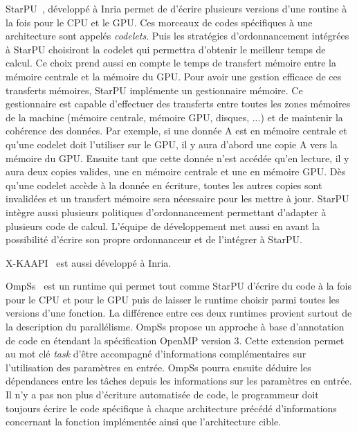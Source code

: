 StarPU~\cite{starpu}, développé à Inria permet de d'écrire plusieurs versions d'une routine à la fois pour le CPU et le GPU.
%
Ces morceaux de codes spécifiques à une architecture sont appelés {\em codelets}.
%
Puis les stratégies d'ordonnancement intégrées à StarPU choisiront la codelet qui permettra d'obtenir le meilleur temps de calcul.
%
Ce choix prend aussi en compte le temps de transfert mémoire entre la mémoire centrale et la mémoire du GPU.
%
Pour avoir une gestion efficace de ces transferts mémoires, StarPU implémente un gestionnaire mémoire.
%
Ce gestionnaire est capable d'effectuer des transferts entre toutes les zones mémoires de la machine (mémoire centrale, mémoire GPU, disques, ...) et de maintenir la cohérence des données.
%
Par exemple, si une donnée A est en mémoire centrale et qu'une codelet doit l'utiliser sur le GPU, il y aura d'abord une copie A vers la mémoire du GPU.
%
Ensuite tant que cette donnée n'est accédée qu'en lecture, il y aura deux copies valides, une en mémoire centrale et une en mémoire GPU.
%
Dès qu'une codelet accède à la donnée en écriture, toutes les autres copies sont invalidées et un transfert mémoire sera nécessaire pour les mettre à jour.
%
StarPU intègre aussi plusieurs politiques d'ordonnancement permettant d'adapter à plusieurs code de calcul.
%
L'équipe de développement met aussi en avant la possibilité d'écrire son propre ordonnanceur et de l'intégrer à StarPU.


X-KAAPI~\cite{xkaapi} est aussi développé à Inria.



OmpSs~\cite{OMPSs} est un runtime qui permet tout comme StarPU d'écrire du code à la fois pour le CPU et pour le GPU puis de laisser le runtime choisir parmi toutes les versions d'une fonction.
%
La différence entre ces deux runtimes provient surtout de la description du parallélisme.
%
OmpSs propose un approche à base d'annotation de code en étendant la spécification OpenMP version 3.
%
Cette extension permet au mot clé {\em task} d'être accompagné d'informations complémentaires sur l'utilisation des paramètres en entrée.
%
OmpSs pourra ensuite déduire les dépendances entre les tâches depuis les informations sur les paramètres en entrée.
%
Il n'y a pas non plus d'écriture automatisée de code, le programmeur doit toujours écrire le code spécifique à chaque architecture précédé d'informations concernant la fonction implémentée ainsi que l'architecture cible.



